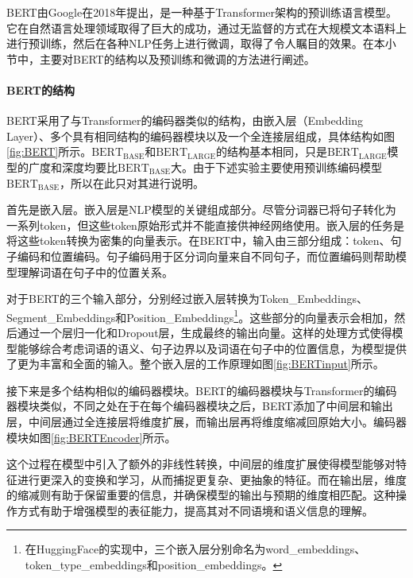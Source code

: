 BERT由Google在2018年提出，是一种基于Transformer架构的预训练语言模型。它在自然语言处理领域取得了巨大的成功，通过无监督的方式在大规模文本语料上进行预训练，然后在各种NLP任务上进行微调，取得了令人瞩目的效果。在本小节中，主要对BERT的结构以及预训练和微调的方法进行阐述。

\paragraph{BERT的结构}

BERT采用了与Transformer的编码器类似的结构，由嵌入层（Embedding Layer）、多个具有相同结构的编码器模块以及一个全连接层组成，具体结构如图\ref{fig:BERT}所示。$\text{BERT}_\text{BASE}$和$\text{BERT}_\text{LARGE}$的结构基本相同，只是$\text{BERT}_\text{LARGE}$模型的广度和深度均要比$\text{BERT}_\text{BASE}$大。由于下述实验主要使用预训练编码模型$\text{BERT}_\text{BASE}$，所以在此只对其进行说明。



首先是嵌入层。嵌入层是NLP模型的关键组成部分。尽管分词器已将句子转化为一系列token，但这些token原始形式并不能直接供神经网络使用。嵌入层的任务是将这些token转换为密集的向量表示。在BERT中，输入由三部分组成：token、句子编码和位置编码。句子编码用于区分词向量来自不同句子，而位置编码则帮助模型理解词语在句子中的位置关系。

对于BERT的三个输入部分，分别经过嵌入层转换为Token\_Embeddings、Segment\_Embeddings和Position\_Embeddings\footnote{在HuggingFace的实现中，三个嵌入层分别命名为word\_embeddings、token\_type\_embeddings和position\_embeddings。}。这些部分的向量表示会相加，然后通过一个层归一化和Dropout层，生成最终的输出向量。这样的处理方式使得模型能够综合考虑词语的语义、句子边界以及词语在句子中的位置信息，为模型提供了更为丰富和全面的输入。整个嵌入层的工作原理如图\ref{fig:BERTinput}所示。



接下来是多个结构相似的编码器模块。BERT的编码器模块与Transformer的编码器模块类似，不同之处在于在每个编码器模块之后，BERT添加了中间层和输出层，中间层通过全连接层将维度扩展，而输出层再将维度缩减回原始大小。编码器模块如图\ref{fig:BERTEncoder}所示。



这个过程在模型中引入了额外的非线性转换，中间层的维度扩展使得模型能够对特征进行更深入的变换和学习，从而捕捉更复杂、更抽象的特征。而在输出层，维度的缩减则有助于保留重要的信息，并确保模型的输出与预期的维度相匹配。这种操作方式有助于增强模型的表征能力，提高其对不同语境和语义信息的理解。

